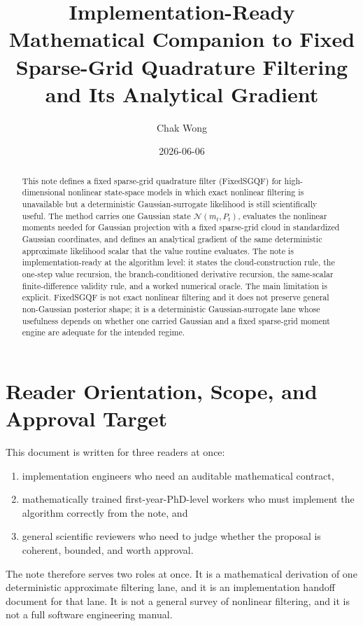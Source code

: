 \documentclass[11pt]{article}
\title{Implementation-Ready Mathematical Companion to Fixed Sparse-Grid Quadrature Filtering and Its Analytical Gradient}
\author{Chak Wong}
\date{2026-06-06}
\numberwithin{equation}{section}
\newcommand{\N}{\mathcal N}
\begin{document}
\maketitle

\begin{abstract}
This note defines a fixed sparse-grid quadrature filter (FixedSGQF) for
high-dimensional nonlinear state-space models in which exact nonlinear filtering
is unavailable but a deterministic Gaussian-surrogate likelihood is still
scientifically useful.  The method carries one Gaussian state
\(\N(m_t,P_t)\), evaluates the nonlinear moments needed for Gaussian projection
with a fixed sparse-grid cloud in standardized Gaussian coordinates, and defines
an analytical gradient of the same deterministic approximate likelihood scalar
that the value routine evaluates.  The note is implementation-ready at the
algorithm level: it states the cloud-construction rule, the one-step value
recursion, the branch-conditioned derivative recursion, the same-scalar
finite-difference validity rule, and a worked numerical oracle.  The main
limitation is explicit.  FixedSGQF is not exact nonlinear filtering and it does
not preserve general non-Gaussian posterior shape; it is a deterministic
Gaussian-surrogate lane whose usefulness depends on whether one carried Gaussian
and a fixed sparse-grid moment engine are adequate for the intended regime.
\end{abstract}

\tableofcontents

\section{Reader Orientation, Scope, and Approval Target}
\label{sec:reader-orientation}

This document is written for three readers at once:
\begin{enumerate}[leftmargin=0.3in]
  \item implementation engineers who need an auditable mathematical contract,
  \item mathematically trained first-year-PhD-level workers who must implement
  the algorithm correctly from the note, and
  \item general scientific reviewers who need to judge whether the proposal is
  coherent, bounded, and worth approval.
\end{enumerate}

The note therefore serves two roles at once.  It is a mathematical derivation of
one deterministic approximate filtering lane, and it is an implementation handoff
document for that lane.  It is not a general survey of nonlinear filtering, and
it is not a full software engineering manual.
\end{document}

